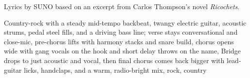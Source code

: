 
\begin{notes}
Lyrics by SUNO based on an excerpt from Carlos Thompson's novel \emph{Ricochets}.
\end{notes}
\begin{style}
Country-rock with a steady mid-tempo backbeat, twangy electric guitar, acoustic strums, pedal steel fills, and a driving bass line; verse stays conversational and close-mic, pre-chorus lifts with harmony stacks and snare build, chorus opens wide with gang vocals on the hook and short delay throws on the name, Bridge drops to just acoustic and vocal, then final chorus comes back bigger with lead-guitar licks, handclaps, and a warm, radio-bright mix, rock, country
\end{style}
